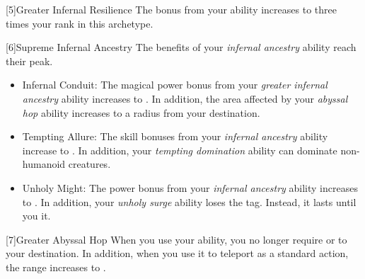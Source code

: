         [5]{Greater Infernal Resilience}  The bonus from your  ability increases to three times your rank in this archetype.

        [6]{Supreme Infernal Ancestry} The benefits of your \textit{infernal ancestry} ability reach their peak.
        \begin{itemize}
            \item Infernal Conduit: The magical power bonus from your \textit{greater infernal ancestry} ability increases to .
                In addition, the area affected by your \textit{abyssal hop} ability increases to a \medarea radius from your destination.
            \item Tempting Allure: The skill bonuses from your \textit{infernal ancestry} ability increase to .
                In addition, your \textit{tempting domination} ability can dominate non-humanoid creatures.
            \item Unholy Might: The power bonus from your \textit{infernal ancestry} ability increases to .
                In addition, your \textit{unholy surge} ability loses the  tag.
                Instead, it lasts until you  it.
        \end{itemize}

        [7]{Greater Abyssal Hop} When you use your  ability, you no longer require  or  to your destination.
        In addition, when you use it to teleport as a standard action, the range increases to \distrange.




